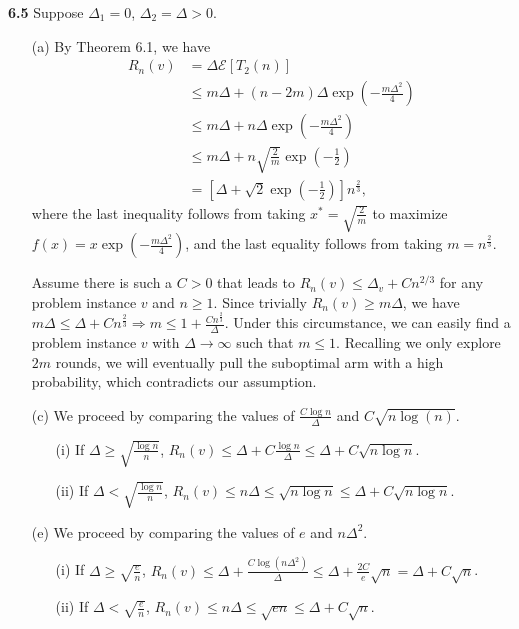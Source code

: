 \noindent\textbf{6.5}
Suppose $\Delta_1 = 0$, $\Delta_2 = \Delta > 0$.

\begin{enumerate}
    \item[(a)] By Theorem 6.1, we have
    \begin{equation*}
        \begin{aligned}
            R_n(v)
            &= \Delta \mathcal{E}[T_2(n)]\\
            &\leq m\Delta + (n - 2m)\Delta \exp (-\frac{m\Delta^2}{4})\\
            &\leq m\Delta + n\Delta \exp (-\frac{m\Delta^2}{4})\\
            &\leq m\Delta + n\sqrt{\frac{2}{m}}\exp(-\frac{1}{2})\\
            &=[\Delta + \sqrt{2}\exp(-\frac{1}{2})]n^{\frac{2}{3}},
        \end{aligned}
    \end{equation*}
    where the last inequality follows from taking $x^* = \sqrt{\frac{2}{m}}$ to maximize $f(x) = x\exp(-\frac{m\Delta^2}{4})$,
    and the last equality follows from taking $m = n^{\frac{2}{3}}$.

    Assume there is such a $C > 0$ that leads to $R_{n}(v) \leq \Delta_{v}+C n^{2 / 3}$ for any problem instance $v$ and $n \geq 1$.
    Since trivially $R_n(v) \geq m\Delta$, we have $m\Delta \leq \Delta + Cn^{\frac{2}{3}} \Rightarrow m \leq 1 + \frac{Cn^{\frac{2}{3}}}{\Delta}$.
    Under this circumstance, we can easily find a problem instance $v$ with $\Delta \rightarrow \infty$ such that $m \leq 1$.
    Recalling we only explore $2m$ rounds, we will eventually pull the suboptimal arm with a high probability, which contradicts our assumption.

    \item[(c)] We proceed by comparing the values of $\frac{C \log n}{\Delta}$ and $C \sqrt{n \log (n)}$.
    \begin{enumerate}
        \item[(i)] If $\Delta \geq \sqrt{\frac{\log n}{n}}$, $R_n(v) \leq \Delta + C\frac{\log n}{\Delta} \leq \Delta + C\sqrt{n\log n}$.
        \item[(ii)] If $\Delta < \sqrt{\frac{\log n}{n}}$, $R_n(v) \leq n \Delta \leq \sqrt{n \log n} \leq \Delta + C\sqrt{n\log n}$.
    \end{enumerate}

    \item[(e)] We proceed by comparing the values of $e$ and $n \Delta^2$.
    \begin{enumerate}
        \item[(i)] If $\Delta \geq \sqrt{\frac{e}{n}}$, $R_n(v) \leq \Delta + \frac{C\log(n\Delta^2)}{\Delta} \leq \Delta + \frac{2C}{e}\sqrt{n} = \Delta + C\sqrt{n}$.
        \item[(ii)] If $\Delta < \sqrt{\frac{e}{n}}$, $R_n(v) \leq n \Delta \leq \sqrt{en} \leq \Delta + C\sqrt{n}$.
    \end{enumerate}
\end{enumerate}